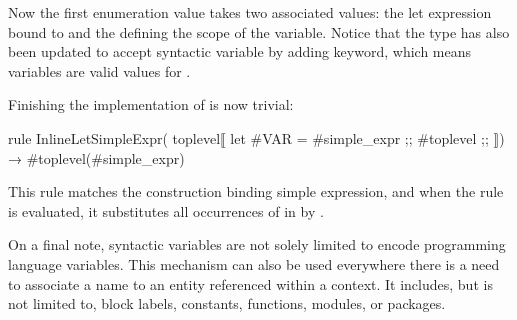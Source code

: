 Now the first  enumeration value  
takes two associated values: the let expression bound to  and 
the  defining the scope of the  variable.
Notice that the type  has also been updated to accept 
syntactic variable by adding  keyword, which means
variables are valid values for  .

\begin{example} Finishing the implementation of  
is now trivial:

\begin{lstTosca}
rule InlineLetSimpleExpr( 
  toplevel⟦ let #VAR = #simple_expr ;; #toplevel ;; ⟧)
  → #toplevel(#simple_expr)
\end{lstTosca}

\end{example}

This rule matches the  construction binding simple expression,
and when the rule is evaluated, it substitutes all occurrences of  
in  by . 

On a final note, syntactic variables are not solely limited to encode programming language
variables. This mechanism can also be used everywhere there is a need
to associate a name to an entity referenced within a context. It
includes, but is not limited to, block labels, constants, functions,
modules, or packages.

